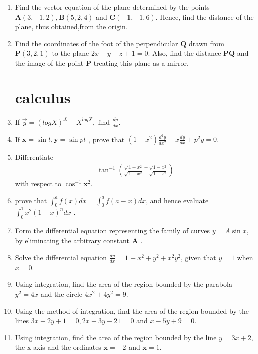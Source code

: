 \documentclass[12pt,-letter paper]{article}
\let\vec\mathbf{}
\let\vec\mathbf{}
\let\vec\mathbf{}
\providecommand{\brak}[1]{\ensuremath{\left(#1\right)}}
\begin{document}
\begin{enumerate}
\item Find the vector equation of the plane determined by the points $\vec{A}\brak{3, -1, 2}, \vec{B}\brak{5, 2, 4}$ and $\vec{C}\brak{-1, -1, 6}$. Hence, find the distance of the plane, thus obtained,from the origin.

\item Find the coordinates of the foot of the perpendicular $\vec{Q}$ drawn from $\vec{P}\brak{3, 2, 1}$ to the plane $2x - y + z + 1 = 0$. Also, find the distance $\vec{P}\vec{Q}$ and the image of the point $\vec{P}$ treating this plane as a mirror.

\section{calculus}
\item If $\Vec{y}=\brak{log X}^{X}+X^{logX},$ find $\frac{dy}{dx}$.


\item If $\vec{x} = \sin t ,  \vec{y}= \sin pt$ , prove that $\brak{1-x^{2}}\frac{d^{2}y}{d x^{2}} - x \frac{dy}{dx} + p^{2}y=0$.

\item Differentiate 
\begin{align*}
  \tan^{-1}\brak{\frac{\sqrt{1+x^{2}}-\sqrt{1-x^{2}}}{\sqrt{1+x^{2}}+\sqrt{1-x^{2}}}}
\end{align*} with respect to $\cos^{-1}\vec{x}^{2}$.

\item prove that $\int_{0}^{a} f \brak {x}d x = \int_{0}^{a} f\brak{a-x} d x$, and hence evaluate  $\int_{0}^{1} x^{2}\brak{1-x}^{n}dx$ .

\item Form the differential equation representing the family of curves $y = A \sin x $, by eliminating the arbitrary constant $\vec{A}$ .

\item Solve the differential equation $\frac{dy} {dx} =1+x^{2}+y^{2}+x^{2}y^{2}$, given that $y = 1$ when $x = 0$.

\item Using integration, find the area of the region bounded by the parabola $y^{2}=4x$ and the circle $4x^{2}+4y^{2}=9$.

\item Using the method of integration, find the area of the region bounded by the lines $3x - 2y + 1 = 0, 2x + 3y - 21 = 0$ and $x - 5y + 9 = 0$.


\item Using integration, find the area of the region bounded by the line
$y = 3x + 2,$ the x-axis and the ordinates $\vec{x} = - 2$ and $\vec{x} = 1$.


\end{enumerate}
\end{document}
